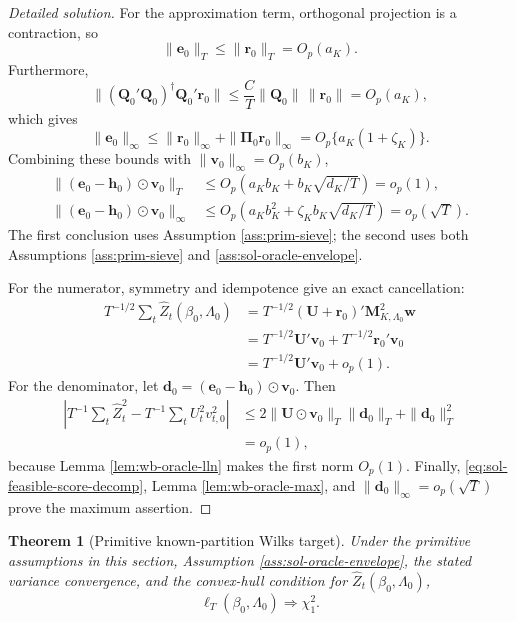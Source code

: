 \documentclass[12pt]{article}
\numberwithin{equation}{section}
\newtheorem{theorem}{Theorem}
\theoremstyle{definition}
\begin{document}
\begin{proof}[Detailed solution]
For the approximation term, orthogonal projection is a contraction, so
\[
    \|\bm e_0\|_T\leq\|\bm r_0\|_T=O_p(a_K).
\]
Furthermore,
\[
    \|(\bm Q_0'\bm Q_0)^\dagger\bm Q_0'\bm r_0\|
    \leq \frac{C}{T}\|\bm Q_0\|\,\|\bm r_0\|
    =O_p(a_K),
\]
which gives
\[
    \|\bm e_0\|_\infty
    \leq \|\bm r_0\|_\infty+\|\bm\Pi_0\bm r_0\|_\infty
    =O_p\{a_K(1+\zeta_K)\}.
\]
Combining these bounds with
\(\|\bm v_0\|_\infty=O_p(b_K)\),
\begin{align*}
    \|(\bm e_0-\bm h_0)\odot\bm v_0\|_T
    &\leq O_p\left(a_Kb_K+b_K\sqrt{d_K/T}\right)=o_p(1),\\
    \|(\bm e_0-\bm h_0)\odot\bm v_0\|_\infty
    &\leq O_p\left(a_Kb_K^2+\zeta_Kb_K\sqrt{d_K/T}\right)
      =o_p(\sqrt T).
\end{align*}
The first conclusion uses Assumption \ref{ass:prim-sieve}; the second uses
both Assumptions \ref{ass:prim-sieve} and
\ref{ass:sol-oracle-envelope}.

For the numerator, symmetry and idempotence give an exact cancellation:
\begin{align*}
    T^{-1/2}\sum_t\widehat Z_t(\beta_0,\Lambda_0)
    &=T^{-1/2}(\bm U+\bm r_0)'
      \bm M_{K,\Lambda_0}^2\bm w\\
    &=T^{-1/2}\bm U'\bm v_0
      +T^{-1/2}\bm r_0'\bm v_0\\
    &=T^{-1/2}\bm U'\bm v_0+o_p(1).
\end{align*}
For the denominator, let
\(\bm d_0=(\bm e_0-\bm h_0)\odot\bm v_0\).  Then
\begin{align*}
    \left|
      T^{-1}\sum_t\widehat Z_t^2
      -T^{-1}\sum_tU_t^2v_{t,0}^2
    \right|
    &\leq
      2\|\bm U\odot\bm v_0\|_T\|\bm d_0\|_T
      +\|\bm d_0\|_T^2\\
    &=o_p(1),
\end{align*}
because Lemma \ref{lem:wb-oracle-lln} makes the first norm \(O_p(1)\).
Finally, \eqref{eq:sol-feasible-score-decomp}, Lemma
\ref{lem:wb-oracle-max}, and \(\|\bm d_0\|_\infty=o_p(\sqrt T)\) prove the
maximum assertion.
\end{proof}


\begin{theorem}[Primitive known-partition Wilks target]
\label{thm:wb-known-wilks}
Under the primitive assumptions in this section, Assumption
\ref{ass:sol-oracle-envelope}, the stated variance convergence, and the
convex-hull condition for \(\widehat Z_t(\beta_0,\Lambda_0)\),
\[
    \ell_T(\beta_0,\Lambda_0)\Rightarrow\chi_1^2.
\]
\end{theorem}
\end{document}
